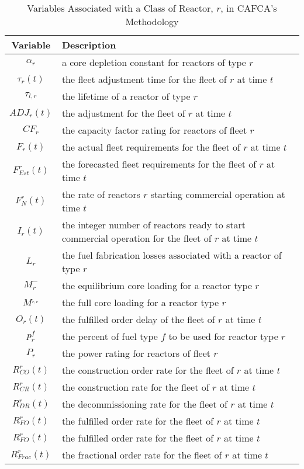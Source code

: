 \begin{table} [H!]
\centering
\begin{tabularx}{\textwidth-20pt}{|c|X|} %
\hline
Variable    & Description \\
\hline
$\alpha_r$       & a core depletion constant for reactors of type $r$  \\
$\tau_r(t)$      & the fleet adjustment time for the fleet of $r$ at time $t$  \\
$\tau_{l,r}$     & the lifetime of a reactor of type $r$  \\
$ADJ_r(t)$       & the adjustment for the fleet of $r$ at time $t$  \\
$CF_r$           & the capacity factor rating for reactors of fleet $r$ \\
$F_r(t)$         & the actual fleet requirements for the fleet of $r$ at time $t$  \\
$F^r_{Est}(t)$   & the forecasted fleet requirements for the fleet of $r$ at time $t$  \\
$F^r_N(t)$       & the rate of reactors $r$ starting commercial operation at time $t$ \\
$I_r(t)$         & the integer number of reactors ready to start commercial operation for the fleet of $r$ at time $t$  \\
$L_r$            & the fuel fabrication losses associated with a reactor of type $r$   \\
$M^-_r$          & the equilibrium core loading for a reactor type $r$   \\
$M^_{r,c}$       & the full core loading for a reactor type $r$   \\
$O_r(t)$         & the fulfilled order delay of the fleet of $r$ at time $t$ \\
$p^f_r$          & the percent of fuel type $f$ to be used for reactor type $r$ \\
$P_r$            & the power rating for reactors of fleet $r$ \\
$R^r_{CO}(t)$    & the construction order rate for the fleet of $r$ at time $t$  \\
$R^r_{CR}(t)$    & the construction rate for the fleet of $r$ at time $t$  \\
$R^r_{DR}(t)$    & the decommissioning rate for the fleet of $r$ at time $t$  \\
$R^r_{FO}(t)$    & the fulfilled order rate for the fleet of $r$ at time $t$  \\
$R^r_{FO}(t)$    & the fulfilled order rate for the fleet of $r$ at time $t$  \\
$R^r_{Frac}(t)$  & the fractional order rate for the fleet of $r$ at time $t$  \\
\hline
\end{tabularx}
\caption{Variables Associated with a Class of Reactor, $r$, in CAFCA's Methodology}
\label{tbl:cafca-rxtr-vars}
\end{table}


